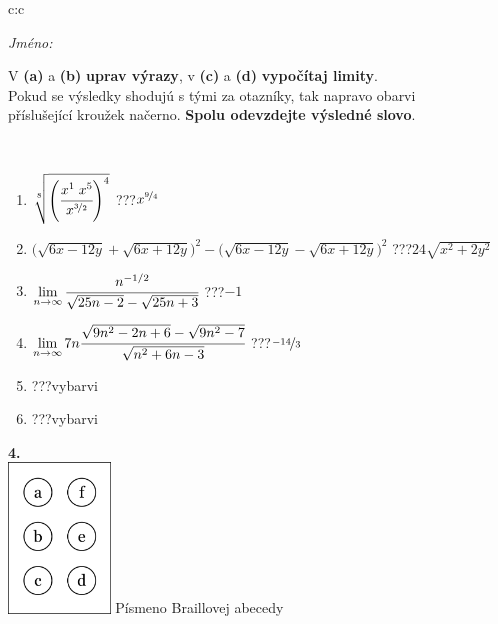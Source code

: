 \documentclass[10pt]{report}
\begin{document}
\begin{tabular}{c:c}
\begin{minipage}[c][104.5mm][t]{0.5\linewidth}
\begin{center}
\textit{Jméno:}\phantom{xxxxxxxxxxxxxxxxxxxxxxxxxxxxxxxxxxxxxxxxxxxxxxxxxxxxxxxxxxxxxxxxx}\\[5mm]
\begin{minipage}{0.95\linewidth}
\begin{center}
V \textbf{(a)} a \textbf{(b)} \textbf{uprav výrazy}, v \textbf{(c)} a \textbf{(d)} \textbf{vypočítaj limity}.\\Pokud se výsledky shodujú s tými za otazníky, tak napravo obarvi\\příslušející kroužek načerno. \textbf{Spolu odevzdejte výsledné slovo}.
\end{center}
\end{minipage}
\\[1mm]
\begin{minipage}{0.79\linewidth}
\begin{center}
\begin{varwidth}{\linewidth}
\begin{enumerate}
\small
\item $\sqrt[8]{\left(\cfrac{x^{1}\;x^{5}}{x^{\nicefrac{3}{2}}}\right)^{4}}$\quad \dotfill\; ???\;\dotfill \quad $x^{\nicefrac{9}{4}}$
\item {\footnotesize{\scriptsize$\big(\sqrt{6x-12y}+\sqrt{6x+12y}\big)^2-\big(\sqrt{6x-12y}-\sqrt{6x+12y}\big)^2$}\quad \dotfill\; ???\;\dotfill \quad $24\sqrt{x^2+2y^2}$}
\item $\lim\limits_{n\to\infty}\cfrac{n^{-1/2}}{\sqrt{25n-2}-\sqrt{25n+3}}$\quad \dotfill\; ???\;\dotfill \quad $-1$
\item $\lim\limits_{n\to\infty}7n\cfrac{\sqrt{9n^2-2n+6}-\sqrt{9n^2-7}}{\sqrt{n^2+6n-3}}$\quad \dotfill\; ???\;\dotfill \quad $\nicefrac{-14}{3}$
\item \quad \dotfill\; ???\;\dotfill \quad vybarvi
\item \quad \dotfill\; ???\;\dotfill \quad vybarvi
\end{enumerate}
\end{varwidth}
\end{center}
\end{minipage}
\begin{minipage}{0.20\linewidth}
\begin{center}
{\Huge\bfseries 4.} \\[2mm]
\includegraphics[height=40mm]{../images/braille.png}
{\small Písmeno Braillovej abecedy}
\end{center}
\end{minipage}
\end{center}
\end{minipage}
%
\end{tabular}
\end{document}
